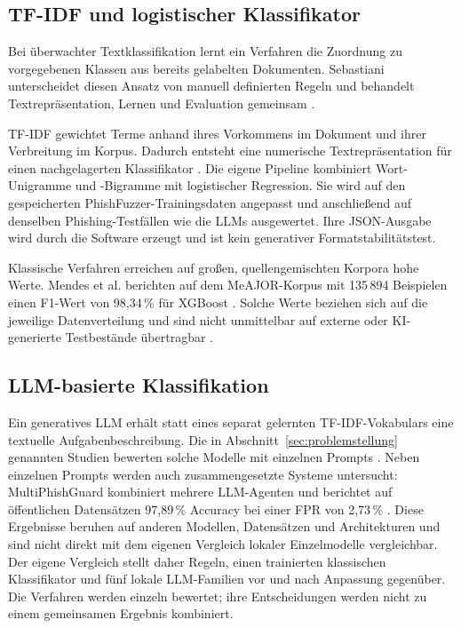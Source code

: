 \documentclass[12pt,twoside=false,a4paper,parskip]{scrbook}
\begin{document}
\subsection{TF-IDF und logistischer Klassifikator}

Bei überwachter Textklassifikation lernt ein Verfahren die Zuordnung zu vorgegebenen Klassen aus bereits gelabelten Dokumenten. Sebastiani unterscheidet diesen Ansatz von manuell definierten Regeln und behandelt Textrepräsentation, Lernen und Evaluation gemeinsam \cite{sebastiani2002text}.

TF-IDF gewichtet Terme anhand ihres Vorkommens im Dokument und ihrer Verbreitung im Korpus. Dadurch entsteht eine numerische Textrepräsentation für einen nachgelagerten Klassifikator \cite{sebastiani2002text}. Die eigene Pipeline kombiniert Wort-Unigramme und -Bigramme mit logistischer Regression. Sie wird auf den gespeicherten PhishFuzzer-Trainingsdaten angepasst und anschließend auf denselben Phishing-Testfällen wie die LLMs ausgewertet. Ihre JSON-Ausgabe wird durch die Software erzeugt und ist kein generativer Formatstabilitätstest.

Klassische Verfahren erreichen auf großen, quellengemischten Korpora hohe Werte. Mendes et al. berichten auf dem MeAJOR-Korpus mit 135\,894 Beispielen einen F1-Wert von 98{,}34\,\% für XGBoost \cite{mendes2025meajor}. Solche Werte beziehen sich auf die jeweilige Datenverteilung und sind nicht unmittelbar auf externe oder KI-generierte Testbestände übertragbar \cite{pajola2025ephishgen}.

\subsection{LLM-basierte Klassifikation}

Ein generatives LLM erhält statt eines separat gelernten TF-IDF-Vokabulars eine textuelle Aufgabenbeschreibung. Die in Abschnitt~\ref{sec:problemstellung} genannten Studien bewerten solche Modelle mit einzelnen Prompts \cite{heiding2024devising,zhang2025benchmarking}. Neben einzelnen Prompts werden auch zusammengesetzte Systeme untersucht: MultiPhishGuard kombiniert mehrere LLM-Agenten und berichtet auf öffentlichen Datensätzen 97{,}89\,\% Accuracy bei einer FPR von 2{,}73\,\% \cite{xue2025multiphishguard}. Diese Ergebnisse beruhen auf anderen Modellen, Datensätzen und Architekturen und sind nicht direkt mit dem eigenen Vergleich lokaler Einzelmodelle vergleichbar. Der eigene Vergleich stellt daher Regeln, einen trainierten klassischen Klassifikator und fünf lokale LLM-Familien vor und nach Anpassung gegenüber. Die Verfahren werden einzeln bewertet; ihre Entscheidungen werden nicht zu einem gemeinsamen Ergebnis kombiniert.
\end{document}
